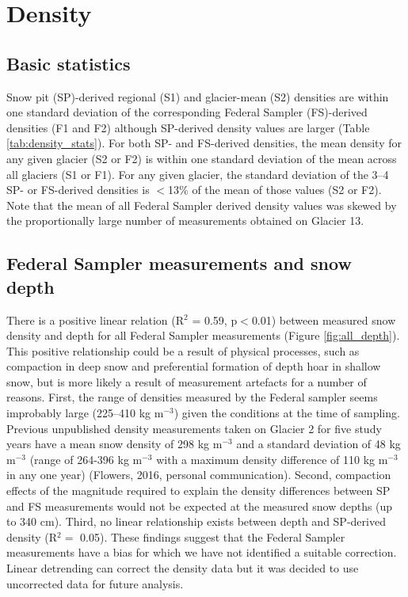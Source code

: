 \documentclass{sfuthesis}
\begin{document}
\section{Density}
\label{sec:density}

\subsection{Basic statistics}

Snow pit (SP)-derived regional (S1) and glacier-mean (S2) densities are within one standard deviation of the corresponding Federal Sampler (FS)-derived densities (F1 and F2) although SP-derived density values are larger (Table \ref{tab:density_stats}). For both SP- and FS-derived densities, the mean density for any given glacier (S2 or F2) is within one standard deviation of the mean across all glaciers (S1 or F1). For any given glacier, the standard deviation of the 3--4 SP- or FS-derived densities is $<$13\% of the mean of those values (S2 or F2). Note that the mean of all Federal Sampler derived density values was skewed by the proportionally large number of measurements obtained on Glacier 13.

\subsection{Federal Sampler measurements and snow depth}
\label{sec:FSdensity&depth}

There is a positive linear relation (R$^2$ = 0.59, p$<$0.01) between measured snow density and depth for all Federal Sampler measurements (Figure \ref{fig:all_depth}). This positive relationship could be a result of physical processes, such as compaction in deep snow and preferential formation of depth hoar in shallow snow, but is more likely a result of measurement artefacts for a number of reasons. First, the range of densities measured by the Federal sampler seems improbably large (225--410 kg m$^{-3}$) given the conditions at the time of sampling. Previous unpublished density measurements taken on Glacier 2 for five study years have a mean snow density of 298 kg m$^{-3}$ and a standard deviation of 48 kg m$^{-3}$ (range of 264-396 kg m$^{-3}$ with a maximum density difference of 110 kg m$^{-3}$ in any one year) (Flowers, 2016, personal communication). Second, compaction effects of the magnitude required to explain the density differences between SP and FS measurements would not be expected at the measured snow depths (up to 340 cm). Third, no linear relationship exists between depth and SP-derived density (R$^2 =$ 0.05). These findings suggest that the Federal Sampler measurements have a bias for which we have not identified a suitable correction. Linear detrending can correct the density data but it was decided to use uncorrected data for future analysis.
\end{document}
